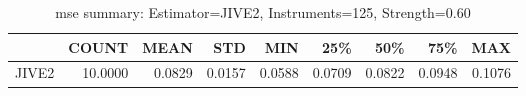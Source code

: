 \begin{table}[ht]
\centering
\caption{mse summary: Estimator=JIVE2, Instruments=125, Strength=0.60}
\begin{tabular}{lrrrrrrrr}
\toprule
 & COUNT & MEAN & STD & MIN & 25\% & 50\% & 75\% & MAX \\
\midrule
JIVE2 & 10.0000 & 0.0829 & 0.0157 & 0.0588 & 0.0709 & 0.0822 & 0.0948 & 0.1076 \\
\bottomrule
\end{tabular}
\end{table}
